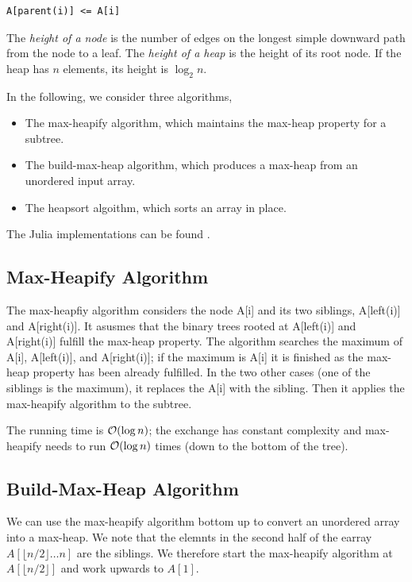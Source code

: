 \begin{verbatim}
A[parent(i)] <= A[i]
\end{verbatim}


The \emph{height of a node} is the number of edges on the longest simple downward path from the node to a leaf. The \emph{height of a heap} is the height of its root node. If the heap has $n$ elements, its height is $\log_2 n$.

In the following, we consider three algorithms,

\begin{itemize}
\item The max-heapify algorithm, which maintains the max-heap property for a subtree.
\item The build-max-heap algorithm, which produces a max-heap from an unordered input array.
\item The heapsort algoithm, which sorts an array in place.
\end{itemize}

The Julia implementations can be found .

\subsection{Max-Heapify Algorithm}

The max-heapfiy algorithm considers the node A[i] and its two siblings, A[left(i)] and A[right(i)]. It asusmes that the binary trees rooted at A[left(i)] and A[right(i)] fulfill the max-heap property. The algorithm searches the maximum of A[i], A[left(i)], and A[right(i)]; if the maximum is A[i] it is finished as the max-heap property has been already fulfilled. In the two other cases (one of the siblings is the maximum), it replaces the A[i] with the sibling. Then it applies the max-heapify algorithm to the subtree.

The running time is $\mathcal{O}(\log n)$; the exchange has constant complexity and max-heapify needs to run $\mathcal{O}(\log n)$ times (down to the bottom of the tree).

\subsection{Build-Max-Heap Algorithm}

We can use the max-heapify algorithm bottom up to convert an unordered array into a max-heap. We note that the elemnts in the second half of the earray $A[\lfloor n/2 \rfloor \ldots n]$ are the siblings. We therefore start the max-heapify algorithm at $A[\lfloor n/2 \rfloor]$ and work upwards to $A[1]$.


